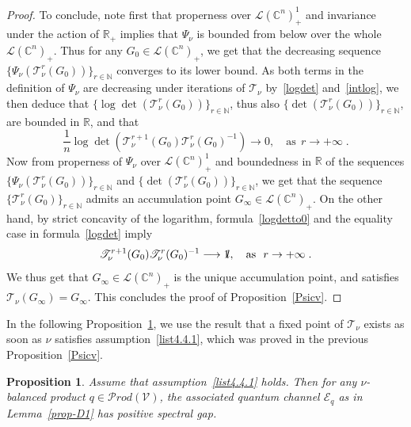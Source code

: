 \documentclass[11pt]{article}
\newtheorem{prop}[theo]{Proposition}
\theoremstyle{definition}
\numberwithin{equation}{section}
\numberwithin{figure}{section}
\numberwithin{table}{section}
\let\cal\mathscr
\newcommand{\R}{{\mathbb{R}}}
\newcommand{\N}{{\mathbb{N}}}
\newcommand{\CCC}{{\mathbb{C}}}
\newcommand{\cE}{{\mathcal{E}}}
\newcommand{\cV}{{\mathcal{V}}}
\newcommand*\id{{1\hskip-2.5pt{\rm l}}}
\newcommand\< {\mathcal{h}}
\renewcommand\> {\mathcal{i}}
\newcommand\TT {{\cal T}}
\newcommand*\cL{\mathscr{L}}
\newcommand{\Prod}{{\mathcal Prod}}
\begin{document}
\begin{proof}
To conclude, note first that properness over $\cL(\CCC^n)_+^1$ and invariance under the action of $\R_+$ implies that $\Psi_\nu$ is bounded from below over the whole $\cL(\CCC^n)_+$. Thus for any $G_0\in\cL(\CCC^n)_+$, we get that the decreasing sequence $\{\Psi_\nu(\TT_\nu^r(G_0))\}_{r\in\N}$ converges to its lower bound. As both terms in the definition of $\Psi_\nu$ are decreasing under iterations of $\TT_\nu$ by~\eqref{logdet} and~\eqref{intlog}, we then deduce that $\{\log\det(\TT_\nu^r(G_0))\}_{r\in\N}$, thus also $\{\det(\TT_\nu^r(G_0))\}_{r\in\N}$, are bounded in $\R$, and that
\begin{equation}\label{logdetto0}
\frac{1}{n}\log\det\left(
\TT_\nu^{r+1}(G_0)\TT_\nu^r(G_0)^{-1}\right)
\longrightarrow 0,\quad\text{as}~~r\to+\infty\;.
\end{equation}
Now from properness of $\Psi_\nu$ over $\cL(\CCC^n)_+^1$ and boundedness in $\R$ of the sequences $\{\Psi_\nu(\TT_\nu^r(G_0))\}_{r\in\N}$ and $\{\det(\TT_\nu^r(G_0))\}_{r\in\N}$, we get that the sequence $\{\TT_\nu^r(G_0)\}_{r\in\N}$ admits an accumulation point $G_\infty\in\cL(\CCC^n)_+$. On the other hand, by strict concavity of the logarithm, formula~\eqref{logdetto0} and the equality case in formula~\eqref{logdet} imply
\begin{equation}
\TT_\nu^{r+1}(G_0)\TT_\nu^r(G_0)^{-1}
\longrightarrow\id,\quad\text{as}~~r\to+\infty\;.
\end{equation}
We thus get that $G_\infty\in\cL(\CCC^n)_+$ is the unique accumulation point, and satisfies $\TT_\nu(G_\infty)=G_\infty$. This concludes the proof of Proposition~\ref{Psicv}.
\end{proof}

In the following Proposition~\ref{prop-D2}, we use the result that a fixed point of $\TT_\nu$ exists as soon as $\nu$ satisfies assumption~\eqref{list4.4.1}, which was proved in the previous Proposition~\ref{Psicv}.
%

\begin{prop}\label{prop-D2}
Assume that assumption~\eqref{list4.4.1} holds. Then for any $\nu$-balan\-ced product $q\in\Prod(\cV)$, the associated quantum channel $\cE_q$ as in Lemma~\ref{prop-D1} has positive spectral gap.
\end{prop}
\end{document}

